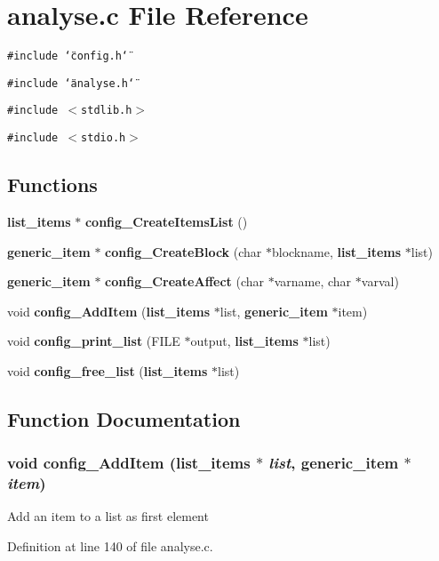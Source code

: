 \section{analyse.c File Reference}
\label{analyse_8c}
{\tt \#include \char`\"{}config.h\char`\"{}}\par
{\tt \#include \char`\"{}analyse.h\char`\"{}}\par
{\tt \#include $<$stdlib.h$>$}\par
{\tt \#include $<$stdio.h$>$}\par
\subsection*{Functions}
\begin{CompactItemize}
\item 
{\bf list\_\-items} $\ast$ {\bf config\_\-CreateItemsList} ()
\item 
{\bf generic\_\-item} $\ast$ {\bf config\_\-CreateBlock} (char $\ast$blockname, {\bf list\_\-items} $\ast$list)
\item 
{\bf generic\_\-item} $\ast$ {\bf config\_\-CreateAffect} (char $\ast$varname, char $\ast$varval)
\item 
void {\bf config\_\-AddItem} ({\bf list\_\-items} $\ast$list, {\bf generic\_\-item} $\ast$item)
\item 
void {\bf config\_\-print\_\-list} (FILE $\ast$output, {\bf list\_\-items} $\ast$list)
\item 
void {\bf config\_\-free\_\-list} ({\bf list\_\-items} $\ast$list)
\end{CompactItemize}


\subsection{Function Documentation}
\subsubsection[{config\_\-AddItem}]{\setlength{\rightskip}{0pt plus 5cm}void config\_\-AddItem ({\bf list\_\-items} $\ast$ {\em list}, \/  {\bf generic\_\-item} $\ast$ {\em item})}\label{analyse_8c_4f7005314a823e91e222533981b18286}


Add an item to a list as first element 

Definition at line 140 of file analyse.c.
